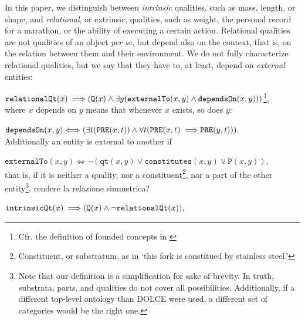 \documentclass[sw]{iosart2x}
\newcommand{\bflist}{\begin{list}{}{\setlength{\topsep}{2mm}\setlength{\partopsep}{0mm}\setlength{\parsep}{0mm}\setlength{\leftmargin}{9mm}\setlength{\labelwidth}{8mm}}}
\newcommand{\eflist}{\end{list}}
\newcommand{\DefLabel}{\textrm{d}}
\newcounter{cntdef}
\newcommand{\mydf}[1]{\refstepcounter{cntdef}\begin{small}{\bf \DefLabel\thecntdef\label{def:#1}}\end{small}}
\newcommand{\generalStyle}[1]{\texttt{#1}}
\newcommand{\biRel}[3]{\generalStyle{#1}(#2,#3)}
\newcommand{\uniRel}[2]{\generalStyle{#1}(#2)}
\newcommand{\myiff}{\Longleftrightarrow}
\newcommand{\myfi}{\hspace{0.9mm} \Longrightarrow}
\newcommand{\DOLCE}{\textsc{DOLCE}\xspace} %
\newcommand{\DOLCEQuality}[1]{\uniRel{Q}{#1}}
\newcommand{\DOLCEPart}[2]{\biRel{{P}}{#1}{#2}}
\newcommand{\DOLCEConstitutes}[2]{\biRel{{constitutes}}{#1}{#2}}
\newcommand{\DOLCEQualityDirect}[2]{\biRel{qt}{#1}{#2}}
\newcommand{\DOLCEPRE}[2]{\biRel{PRE}{#1}{#2}}
\newcommand{\RelationalQuality}[1]{\uniRel{relationalQt}{#1}}
\newcommand{\IntrinsicQuality}[1]{\uniRel{intrinsicQt}{#1}}
\newcommand{\specificallyDependsOn}[2]{\biRel{dependsOn}{#1}{#2}}
\newcommand{\external}[2]{\biRel{externalTo}{#1}{#2}}
\newcommand{\internal}[2]{\biRel{internalTo}{#1}{#2}}
\newcommand{\firstTimeKeyWord}[1]{\textit{#1}}
\newcommand{\quotes}[1]{`#1'}
\newcommand{\TODO}[1]{{\color{red} #1}}
\begin{document}
In this paper, we distinguish between \firstTimeKeyWord{intrinsic} qualities, such as mass, length, or shape, and \firstTimeKeyWord{relational}, or extrinsic, qualities, such as weight, the personal record for a marathon, or the ability of executing a certain action. 
Relational qualities are not qualities of an object \textit{per se}, but depend also on the context, that is, on the relation between them and their environment.
We do not fully characterize relational qualities, but we say that they have to, at least, depend on \firstTimeKeyWord{external} entities: 
\bflist
  \item[\mydf{relationalQtPartialDef}] $ \RelationalQuality{x} \myfi  ( \DOLCEQuality{x} \land \\ \exists y(\external{x}{y} \land \specificallyDependsOn{x}{y}))$\footnote{Cfr. the definition of founded concepts in \cite{masoloSocialRolesTheir2004}}, \\ %
  where $x$ depends on $y$ means that whenever $x$ exists, so does $y$: 
  \item[\mydf{specificallyDependsOn}] $ \specificallyDependsOn{x}{y} \myiff (\exists t(\DOLCEPRE{x}{t}) \land \forall t(\DOLCEPRE{x}{t} \myfi \DOLCEPRE{y}{t})). $
  \\ Additionally an entity is external to another if 
  \item[\mydf{external}] $ \external{x}{y} \myiff \neg (\DOLCEQualityDirect{x}{y} \lor \DOLCEConstitutes{x}{y} \lor \DOLCEPart{x}{y}),$ \\ that is, if it is neither a quality, nor a constituent\footnote{Constituent, or substratum, as in \quotes{this fork is constitued by stainless steel.}}, nor a part of the other entity\footnote{Note that our definition is a simplification for sake of brevity. In truth, substrata, parts, and qualities do not cover all possibilities.
  Additionally, if a different top-level ontology than \DOLCE  were used, a different set of categories would be the right one.}. 
  \TODO{rendere la relazione simmetrica?}
  \item[\mydf{intrinsicQtPartialDef}] $ \IntrinsicQuality{x} \myfi  ( \DOLCEQuality{x} \land \neg  \RelationalQuality{x}), $
\eflist
\end{document}
